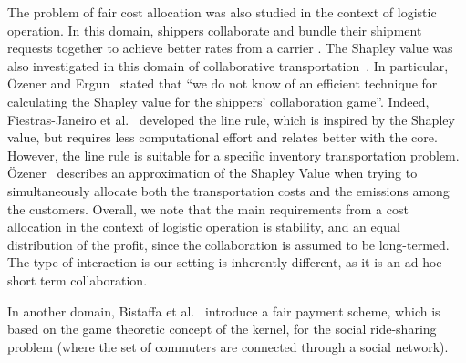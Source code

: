 \documentclass[sigconf]{aamas}
\begin{document}
The problem of fair cost allocation was also studied in the context of logistic operation. In this domain, shippers collaborate and bundle their shipment requests together to achieve better rates from a carrier \cite{guajardo2016review}. The Shapley value was also investigated in this domain of collaborative transportation~\cite{frisk2010cost,sun2015transportation}.
In particular, {\"O}zener and Ergun~\cite{ozener2008allocating} stated that ``we do not know of an efficient technique for calculating the Shapley value for the shippers' collaboration game''. Indeed, Fiestras-Janeiro et al.~\cite{Fiestras-Janeiro2012} developed the line rule, which is inspired by the Shapley value, but requires less computational effort and relates better with the core. However, the line rule is suitable for a specific inventory transportation problem. 
{\"O}zener~\cite{ozener2014developing} describes an approximation of the Shapley Value when trying to simultaneously allocate both the transportation costs and the emissions among the customers. Overall, we note that the main requirements from a cost allocation in the context of logistic operation is stability, and an equal distribution of the profit, since the collaboration is assumed to be long-termed. The type of interaction is our setting is inherently different, as it is an ad-hoc short term collaboration.

%
%

In another domain, Bistaffa et al.~\cite{bistaffa2015recommending} introduce a fair payment scheme, which is based on the game theoretic concept of the kernel, for the social ride-sharing problem (where the set of commuters are connected through a social network).

\end{document}

